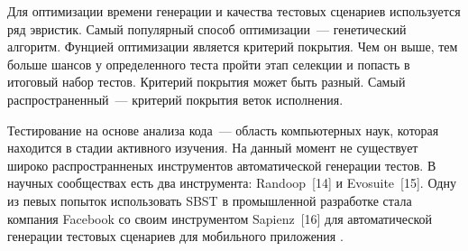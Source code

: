 Для оптимизации времени генерации и качества тестовых сценариев используется ряд эвристик. Самый популярный способ оптимизации~--- генетический алгоритм. Фунцией оптимизации является критерий покрытия. Чем он выше, тем больше шансов у определенного теста пройти этап селекции и попасть в итоговый набор тестов. Критерий покрытия может быть разный. Самый распространенный~--- критерий покрытия веток исполнения. 

Тестирование на основе анализа кода~--- область компьютерных наук, которая находится в стадии активного изучения. На данный момент не существует широко распространненых инструментов автоматической генерации тестов. В научных сообществах есть два инструмента: Randoop~[14] и Evosuite~[15]. Одну из певых попыток использовать SBST в промышленной разработке стала компания Facebook со своим инструментом Sapienz~[16] для автоматической генерации тестовых сценариев для мобильного приложения . 

